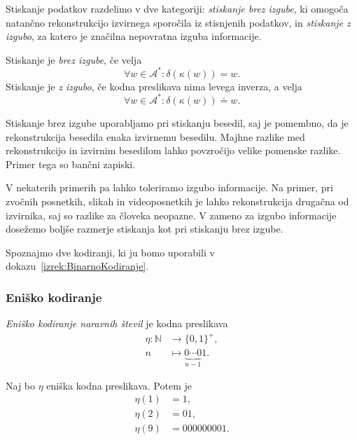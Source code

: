 \documentclass[fin1, tisk]{fmfdelo}
\newcommand{\N}{\mathbb{N}}
\newcommand{\A}{\mathcal{A}}
\theoremstyle{definition}
\begin{document}
Stiskanje podatkov razdelimo v dve kategoriji: \emph{stiskanje brez izgube}, ki omogoča natančno
rekonstrukcijo izvirnega sporočila iz stisnjenih podatkov, in \emph{stiskanje z izgubo}, za katero
je značilna nepovratna izguba informacije.

\begin{definicija}
    Stiskanje je \emph{brez izgube}, če velja
    \[
        \forall w \in \A^* \colon \delta(\kappa(w)) = w.
    \]
    Stiskanje je \emph{z izgubo}, če kodna preslikava nima levega inverza,
    a velja
    \[
        \forall w \in \A^* \colon \delta(\kappa(w)) \doteq w.
    \]
\end{definicija}

Stiskanje brez izgube uporabljamo pri stiskanju besedil, saj je pomembno, da je rekonstrukcija
besedila enaka izvirnemu besedilu. Majhne razlike med rekonstrukcijo in izvirnim besedilom 
lahko povzročijo velike pomenske razlike. Primer tega so bančni zapiski.

V nekaterih primerih pa lahko toleriramo izgubo informacije. Na primer, pri zvočnih posnetkih, 
slikah in videoposnetkih je lahko rekonstrukcija drugačna od izvirnika, saj so razlike za 
človeka neopazne. V zameno za izgubo informacije dosežemo boljše razmerje stiskanja kot
pri stiskanju brez izgube.

Spoznajmo dve kodiranji, ki ju bomo uporabili v dokazu~\ref{izrek:BinarnoKodiranje}.

\subsubsection{Eniško kodiranje}

\begin{definicija}\label{def:eniška}%
    \emph{Eniško kodiranje naravnih števil} je kodna preslikava 
    \begin{align*}
        \eta \colon \N &\to \{ 0, 1 \}^+, \\
        n &\mapsto \underbrace{0 \cdots 0}_{n-1}1.
    \end{align*}
\end{definicija}

\begin{primer}
    Naj bo $\eta$ eniška kodna preslikava. Potem je
    \begin{align*}
        \eta(1) &= 1, \\
        \eta(2) &= 01, \\ 
        \eta(9) &= 000000001.
    \end{align*}
\end{primer}
\end{document}
